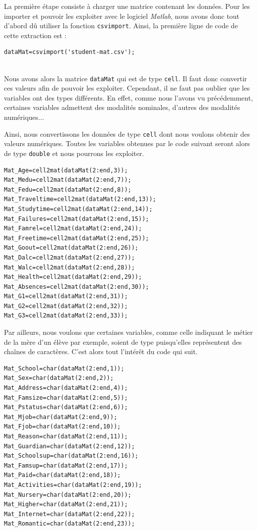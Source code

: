 \documentclass[11pt]{article}
\begin{document}
La première étape consiste à charger une matrice contenant les données. Pour les importer et pouvoir les exploiter avec le logiciel \emph{Matlab}, nous avons donc tout d'abord dû utiliser la fonction \texttt{csvimport}. Ainsi, la première ligne de code de cette extraction est :

\begin{lstlisting}[firstnumber=2,caption={Extraction des données du fichier CSV dans une matrice de \texttt{cell}}]
dataMat=csvimport('student-mat.csv');
\end{lstlisting}
~\\

Nous avons alors la matrice \texttt{dataMat} qui est de type \texttt{cell}. Il faut donc convertir ces valeurs afin de pouvoir les exploiter. Cependant, il ne faut pas oublier que les variables ont des types différents. En effet, comme nous l'avons vu précédemment, certaines variables admettent des modalités nominales, d'autres des modalités numériques... 

Ainsi, nous convertissons les données de type \texttt{cell} dont nous voulons obtenir des valeurs numériques. Toutes les variables obtenues par le code suivant seront alors de type \texttt{double} et nous pourrons les exploiter.

\begin{lstlisting}[firstnumber=4,caption={Transformation de \texttt{cell} en \texttt{double}}]
% Donnees numeriques
Mat_Age=cell2mat(dataMat(2:end,3));
Mat_Medu=cell2mat(dataMat(2:end,7));
Mat_Fedu=cell2mat(dataMat(2:end,8));
Mat_Traveltime=cell2mat(dataMat(2:end,13));
Mat_Studytime=cell2mat(dataMat(2:end,14));
Mat_Failures=cell2mat(dataMat(2:end,15));
Mat_Famrel=cell2mat(dataMat(2:end,24));
Mat_Freetime=cell2mat(dataMat(2:end,25));
Mat_Goout=cell2mat(dataMat(2:end,26));
Mat_Dalc=cell2mat(dataMat(2:end,27));
Mat_Walc=cell2mat(dataMat(2:end,28));
Mat_Health=cell2mat(dataMat(2:end,29));
Mat_Absences=cell2mat(dataMat(2:end,30));
Mat_G1=cell2mat(dataMat(2:end,31));
Mat_G2=cell2mat(dataMat(2:end,32));
Mat_G3=cell2mat(dataMat(2:end,33));
\end{lstlisting}

Par ailleurs, nous voulons que certaines variables, comme celle indiquant le métier de la mère d'un élève par exemple, soient de type  puisqu'elles représentent des chaînes de caractères. C'est alors tout l'intérêt du code qui suit.

\begin{lstlisting}[firstnumber=22,caption={Transformation de \texttt{cell} en \texttt{char}}]
% Donnees en chaines de caracteres
Mat_School=char(dataMat(2:end,1));
Mat_Sex=char(dataMat(2:end,2));
Mat_Address=char(dataMat(2:end,4));
Mat_Famsize=char(dataMat(2:end,5));
Mat_Pstatus=char(dataMat(2:end,6));
Mat_Mjob=char(dataMat(2:end,9));
Mat_Fjob=char(dataMat(2:end,10));
Mat_Reason=char(dataMat(2:end,11));
Mat_Guardian=char(dataMat(2:end,12));
Mat_Schoolsup=char(dataMat(2:end,16));
Mat_Famsup=char(dataMat(2:end,17));
Mat_Paid=char(dataMat(2:end,18));
Mat_Activities=char(dataMat(2:end,19));
Mat_Nursery=char(dataMat(2:end,20));
Mat_Higher=char(dataMat(2:end,21));
Mat_Internet=char(dataMat(2:end,22));
Mat_Romantic=char(dataMat(2:end,23));
\end{lstlisting}
\end{document}
